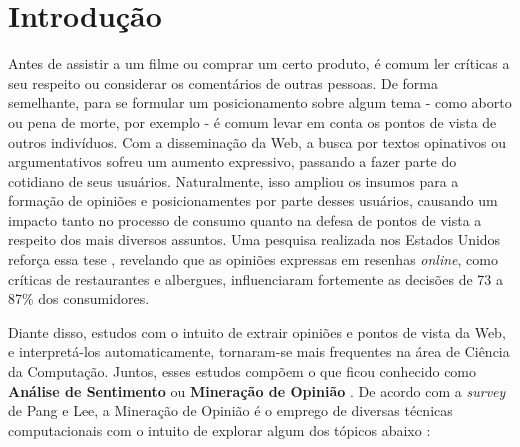 \chapter{Introdução}



Antes de assistir a um filme ou comprar um certo produto, é comum ler críticas a seu respeito ou considerar os comentários de outras pessoas. De forma semelhante, para se formular um posicionamento sobre algum tema - como aborto ou pena de morte, por exemplo - é comum levar em conta os pontos de vista de outros indivíduos. Com a disseminação da Web, a busca por textos opinativos ou argumentativos sofreu um aumento expressivo, passando a fazer parte do cotidiano de seus usuários. Naturalmente, isso ampliou os insumos para a formação de opiniões e posicionamentes por parte desses usuários, causando um impacto tanto no processo de consumo quanto na defesa de pontos de vista a respeito dos mais diversos assuntos. Uma pesquisa realizada nos Estados Unidos reforça essa tese \cite{pesquisa-eua}, revelando que as opiniões expressas em resenhas \emph{online}, como críticas de restaurantes e albergues, influenciaram fortemente as decisões de 73 a 87\% dos consumidores.

Diante disso, estudos com o intuito de extrair opiniões e pontos de vista da Web, e interpretá-los automaticamente, tornaram-se mais frequentes na área de Ciência da Computação. Juntos, esses estudos compõem o que ficou conhecido como \textbf{Análise de Sentimento} ou \textbf{Mineração de Opinião} \cite{omsa,bingliu}. De acordo com a \emph{survey} de Pang e Lee, a Mineração de Opinião é o emprego de diversas técnicas computacionais com o intuito de explorar algum dos tópicos abaixo \cite{omsa}:


   



